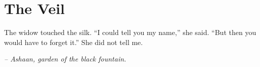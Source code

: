 \chapter*{The Veil}

The widow touched the silk. ``I could tell you my name,'' she said. ``But then you would have to forget it.'' She did not tell me.

\smallskip

\noindent \textit{-- Ashaan, garden of the black fountain.}

